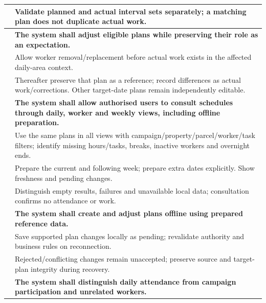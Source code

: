 {\begin{longtable}{L{0.18}L{0.82}}
\label{ac:026:c} & Validate planned and actual interval sets separately; a matching plan does not duplicate actual work.\\
\midrule
{}
\label{fr:027}\textbf{} & \textbf{The system shall adjust eligible plans while preserving their role as an expectation.}\\*
\label{ac:027:a} & Allow worker removal/replacement before actual work exists in the affected daily-area context.\\
\label{ac:027:b} & Thereafter preserve that plan as a reference; record differences as actual work/corrections. Other target-date plans remain independently editable.\\
\midrule
{}
\label{fr:028}\textbf{} & \textbf{The system shall allow authorised users to consult schedules through daily, worker and weekly views, including offline preparation.}\\*
\label{ac:028:a} & Use the same plans in all views with campaign/property/parcel/worker/task filters; identify missing hours/tasks, breaks, inactive workers and overnight ends.\\
\label{ac:028:b} & Prepare the current and following week; prepare extra dates explicitly. Show freshness and pending changes.\\
\label{ac:028:c} & Distinguish empty results, failures and unavailable local data; consultation confirms no attendance or work.\\
\midrule
{}
\label{fr:029}\textbf{} & \textbf{The system shall create and adjust plans offline using prepared reference data.}\\*
\label{ac:029:a} & Save supported plan changes locally as pending; revalidate authority and business rules on reconnection.\\
\label{ac:029:b} & Rejected/conflicting changes remain unaccepted; preserve source and target-plan integrity during recovery.\\
\midrule
{}
\label{fr:030}\textbf{} & \textbf{The system shall distinguish daily attendance from campaign participation and unrelated workers.}\\*

\end{longtable}}
